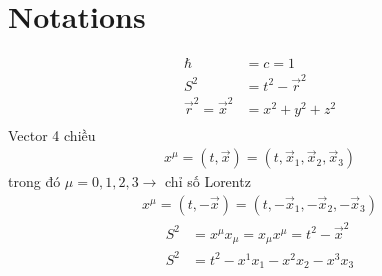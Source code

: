 \documentclass{report}
\begin{document}
\section*{Notations}
\begin{align*}
	\hbar                                       & = c = 1                      \\
	S^2                                         & = t^2 - \overrightarrow{r}^2 \\
	\overrightarrow{r}^2 = \overrightarrow{x}^2 & = x^2 +y^2 +z^2              \\
\end{align*}
Vector 4 chiều
\begin{align*}
	x^{\mu} =(t,\overrightarrow{x}) = (t,\overrightarrow{x}_1,\overrightarrow{x}_2,\overrightarrow{x}_3)
\end{align*}
trong đó $\mu=0,1,2,3 \rightarrow$ chỉ số Lorentz
\begin{align*}
	x^{\mu} =(t,-\overrightarrow{x}) = (t,-\overrightarrow{x}_1,-\overrightarrow{x}_2,-\overrightarrow{x}_3)
\end{align*}
\begin{align*}
	S^2 & = x^\mu x_\mu=  x_\mu  x^\mu = t^2 - \overrightarrow{x}^2 \\
	S^2 & = t^2 - x^1 x_1 - x^2 x_2 - x^3 x_3
\end{align*}

\clearpage
\end{document}
